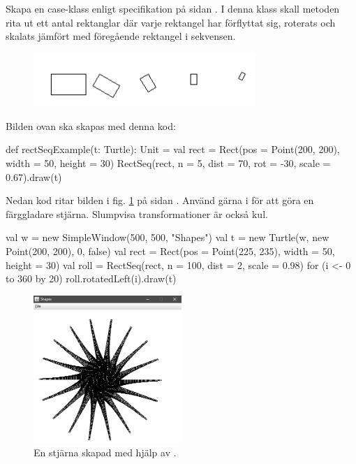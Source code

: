 \Task Skapa en case-klass  enligt specifikation på sidan \pageref{code:classes:graphics:rectanglesequence}. I denna klass skall metoden  rita ut ett antal rektanglar där varje rektangel har förflyttat sig, roterats och skalats jämfört med föregående rektangel i sekvensen.

\begin{figure}[H]
\centering
\includegraphics[width=0.75\textwidth]{../img/turtle/RectSeq.png}
\end{figure}
\noindent Bilden ovan ska skapas med denna kod:
\begin{Code}
  def rectSeqExample(t: Turtle): Unit  = {
    val rect = Rect(pos = Point(200, 200), width = 50, height = 30)
    RectSeq(rect, n = 5, dist = 70, rot = -30, scale = 0.67).draw(t)
  }
\end{Code}

\noindent Nedan kod ritar bilden i fig. \ref{fig:classes:graphics:rectanglesequence} på sidan \pageref{fig:classes:graphics:rectanglesequence}. Använd gärna  i  för att göra en färggladare stjärna. Slumpvisa transformationer är också kul.

\begin{Code}
val w = new SimpleWindow(500, 500, "Shapes")
val t = new Turtle(w, new Point(200, 200), 0, false)
val rect = Rect(pos = Point(225, 235), width = 50, height = 30)
val roll = RectSeq(rect, n = 100, dist = 2, scale = 0.98)
for (i <- 0 to 360 by 20) roll.rotatedLeft(i).draw(t)
\end{Code}


\begin{figure}
\centering
\includegraphics[width=0.5\textwidth]{../img/w06-lab/RectangleSequence.png}
\caption {En stjärna skapad med hjälp av .}
\label{fig:classes:graphics:rectanglesequence}
\end{figure}

